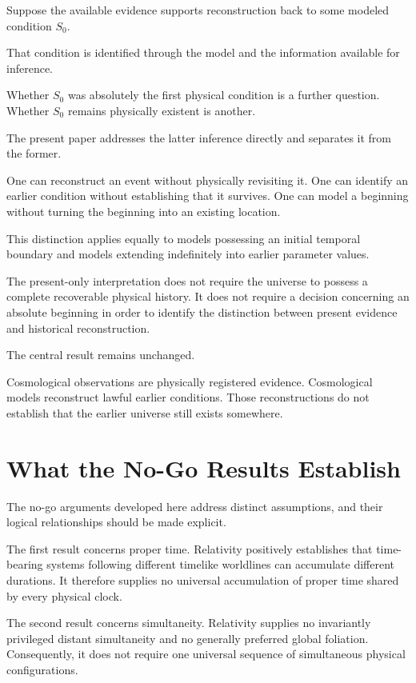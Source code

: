 \documentclass[12pt,onecolumn]{article}
\begin{document}
Suppose the available evidence supports reconstruction back to some modeled condition \(S_0\).

That condition is identified through the model and the information available for inference.

Whether \(S_0\) was absolutely the first physical condition is a further question. Whether \(S_0\) remains physically existent is another.

The present paper addresses the latter inference directly and separates it from the former.

One can reconstruct an event without physically revisiting it. One can identify an earlier condition without establishing that it survives. One can model a beginning without turning the beginning into an existing location.

This distinction applies equally to models possessing an initial temporal boundary and models extending indefinitely into earlier parameter values.

The present-only interpretation does not require the universe to possess a complete recoverable physical history. It does not require a decision concerning an absolute beginning in order to identify the distinction between present evidence and historical reconstruction.

The central result remains unchanged.

Cosmological observations are physically registered evidence. Cosmological models reconstruct lawful earlier conditions. Those reconstructions do not establish that the earlier universe still exists somewhere.

\section{What the No-Go Results Establish}

The no-go arguments developed here address distinct assumptions, and their logical relationships should be made explicit.

The first result concerns proper time. Relativity positively establishes that time-bearing systems following different timelike worldlines can accumulate different durations. It therefore supplies no universal accumulation of proper time shared by every physical clock.

The second result concerns simultaneity. Relativity supplies no invariantly privileged distant simultaneity and no generally preferred global foliation. Consequently, it does not require one universal sequence of simultaneous physical configurations.
\end{document}
